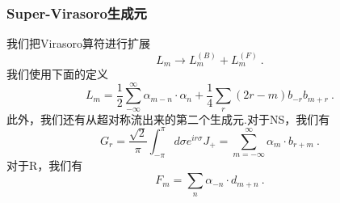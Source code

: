 \subsubsection{Super-Virasoro生成元}
我们把Virasoro算符进行扩展
\begin{equation}
L_m \rightarrow L_m^{(B)} + L_m^{(F)}~.
\end{equation}
我们使用下面的定义
\begin{equation}
L_m = \frac{1}{2} \sum_{-\infty}^{\infty} \alpha_{m-n} \cdot \alpha_n + \frac{1}{4} \sum_r (2r-m) b_{-r} b_{m+r}~.
\end{equation}
此外，我们还有从超对称流出来的第二个生成元.对于NS，我们有
\begin{equation}
G_r = \frac{\sqrt{2}}{\pi} \int_{-\pi}^{\pi} d\sigma e^{ir\sigma} J_+ = \sum_{m=-\infty}^{\infty} \alpha_m \cdot b_{r+m}~.
\end{equation}
对于R，我们有
\begin{equation}
F_m = \sum_n \alpha_{-n} \cdot d_{m+n}~.
\end{equation}














































